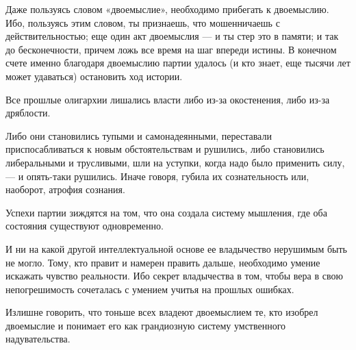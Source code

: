 Даже пользуясь словом «двоемыслие», необходимо прибегать к двоемыслию. Ибо,
пользуясь этим словом, ты признаешь, что мошенничаешь с действительностью; еще
один акт двоемыслия — и ты стер это в памяти; и так до бесконечности, причем
ложь все время на шаг впереди истины. В конечном счете именно благодаря
двоемыслию партии удалось (и кто знает, еще тысячи лет может удаваться)
остановить ход истории.

Все прошлые олигархии лишались власти либо из-за окостенения, либо из-за
дряблости. 

Либо они становились тупыми и самонадеянными, переставали приспосабливаться к
новым обстоятельствам и рушились, либо становились либеральными и трусливыми,
шли на уступки, когда надо было применить силу, — и опять-таки рушились. Иначе
говоря, губила их сознательность или, наоборот, атрофия сознания. 

Успехи партии зиждятся на том, что она создала систему мышления, где оба
состояния существуют одновременно. 

И ни на какой другой интеллектуальной основе ее владычество нерушимым быть не
могло. Тому, кто правит и намерен править дальше, необходимо умение искажать
чувство реальности. Ибо секрет владычества в том, чтобы вера в свою
непогрешимость сочеталась с умением учитья на прошлых ошибках.

Излишне говорить, что тоньше всех владеют двоемыслием те, кто изобрел
двоемыслие и понимает его как грандиозную систему умственного надувательства. 

